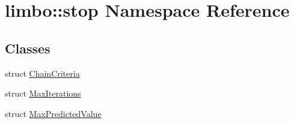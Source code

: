\hypertarget{namespacelimbo_1_1stop}{}\section{limbo\+:\+:stop Namespace Reference}
\label{namespacelimbo_1_1stop}
\subsection*{Classes}
\begin{DoxyCompactItemize}
\item 
struct \hyperlink{structlimbo_1_1stop_1_1_chain_criteria}{Chain\+Criteria}
\item 
struct \hyperlink{structlimbo_1_1stop_1_1_max_iterations}{Max\+Iterations}
\item 
struct \hyperlink{structlimbo_1_1stop_1_1_max_predicted_value}{Max\+Predicted\+Value}
\end{DoxyCompactItemize}
